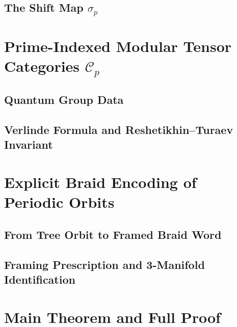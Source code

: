 \documentclass[11pt,a4paper]{amsart}
\begin{document}
\subsection{The Shift Map \(\sigma_p\)}


\section{Prime-Indexed Modular Tensor Categories \(\mathcal{C}_p\)}
\label{sec:mtc}

\subsection{Quantum Group Data}


\subsection{Verlinde Formula and Reshetikhin--Turaev Invariant}


\section{Explicit Braid Encoding of Periodic Orbits}
\label{sec:braid}

\subsection{From Tree Orbit to Framed Braid Word}


\subsection{Framing Prescription and 3-Manifold Identification}


\section{Main Theorem and Full Proof}
\label{sec:proof}
\end{document}
